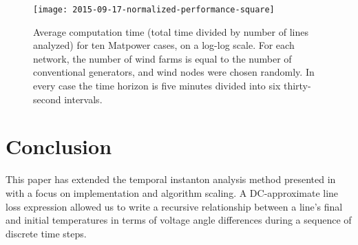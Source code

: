 \documentclass[journal,twoside]{IEEEtran}
\begin{document}
\begin{figure}
\centering
\texttt{[image: 2015-09-17-normalized-performance-square]}
\caption{Average computation time (total time divided by number of lines analyzed) for ten Matpower cases, on a log-log scale. For each network, the number of wind farms is equal to the number of conventional generators, and wind nodes were chosen randomly. In every case the time horizon is five minutes divided into six thirty-second intervals.}
\label{fig:normalized-performance}
\end{figure}


\section{Conclusion}\label{sec:conclusion}
This paper has extended the temporal instanton analysis method presented in \cite{kersulis2015} with a focus on implementation and algorithm scaling. A DC-approximate line loss expression allowed us to write a recursive relationship between a line's final and initial temperatures in terms of voltage angle differences during a sequence of discrete time steps.




%
%
\end{document}
